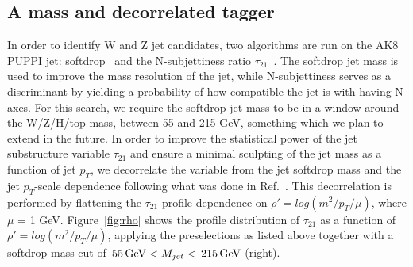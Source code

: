 \subsection{A mass and \PT decorrelated tagger}
\label{sec:searchIII:ddt}
In order to identify W and Z jet candidates, two algorithms are run on the AK8 PUPPI jet: softdrop~\cite{softdrop} and the N-subjettiness ratio $\tau_{21}$~\cite{nsubjettiness}.
The softdrop jet mass is used to improve the mass resolution of the jet, while N-subjettiness serves as a discriminant by yielding a probability of how compatible the jet is with having N axes. For this search, we require the softdrop-jet mass to be in a window around the W/Z/H/top mass, between 55 and 215 GeV, something which we plan to extend in the future. In order to improve the statistical power of the jet substructure variable $\tau_{21}$ and ensure a minimal sculpting of the jet mass as a function of jet $p_T$,
we decorrelate the variable from the jet softdrop mass and the jet $p_T$-scale dependence following what was done in Ref.~\cite{ddt}.
This decorrelation is performed by flattening the $\tau_{21}$ profile dependence on $\rho' = log(m^2/p_T/\mu)$, where $\mu$ = 1 GeV.
Figure~\ref{fig:rho} shows the profile distribution of $\tau_{21}$ as a function of $\rho' = log(m^2/p_T/\mu)$, applying the preselections as listed above together with a softdrop mass cut of $\text{\,55}{\ensuremath{\,\text{Ge\hspace{-.08em}V}}} < M_{jet} < \text{\,215}{\ensuremath{\,\text{Ge\hspace{-.08em}V}}}$ (right).
